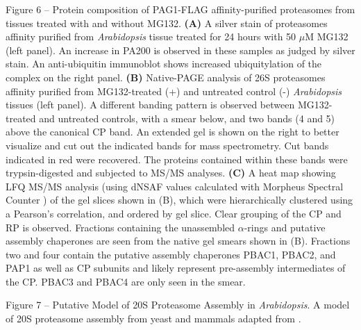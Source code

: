Figure 6 – Protein composition of PAG1-FLAG affinity-purified proteasomes from tissues treated with and without MG132. \textbf{(A)} A silver stain of proteasomes affinity purified from \textit{Arabidopsis} tissue treated for 24 hours with 50 $\mu$M MG132 (left panel). An increase in PA200 is observed in these samples as judged by silver stain. An anti-ubiquitin immunoblot shows increased ubiquitylation of the complex on the right panel. \textbf{(B)} Native-PAGE analysis of 26S proteasomes affinity purified from MG132-treated (+) and untreated control (-) \textit{Arabidopsis} tissues (left panel). A different banding pattern is observed between MG132-treated and untreated controls, with a smear below, and two bands (4 and 5) above the canonical CP band. An extended gel is shown on the right to better visualize and cut out the indicated bands for mass spectrometry. Cut bands indicated in red were recovered. The proteins contained within these bands were trypsin-digested and subjected to MS/MS analyses. \textbf{(C)} A heat map showing LFQ MS/MS analysis (using dNSAF values calculated with Morpheus Spectral Counter \citep{gemperline16}) of the gel slices shown in (B), which were hierarchically clustered using a Pearson’s correlation, and ordered by gel slice. Clear grouping of the CP and RP is observed. Fractions containing the unassembled $\alpha$-rings and putative assembly chaperones are seen from the native gel smears shown in (B). Fractions two and four contain the putative assembly chaperones PBAC1, PBAC2, and PAP1 as well as CP subunits and likely represent pre-assembly intermediates of the CP. PBAC3 and PBAC4 are only seen in the smear.

Figure 7 – Putative Model of 20S Proteasome Assembly in \textit{Arabidopsis}. A model of 20S proteasome assembly from yeast and mammals adapted from \citep{murata09}.


